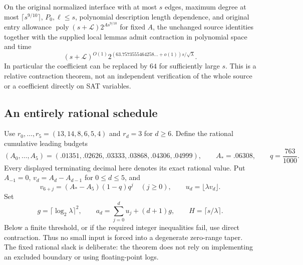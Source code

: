 \begin{theorem}
\label{thm:multistage-generic}
On the original normalized interface with at most $s$ edges, maximum degree
at most $\lceil s^{9/10}\rceil$, $P_0,\ell\le s$, polynomial description
length dependence, and original entry allowance
$\operatorname{poly}(s+\mathcal L)2^{A s^{9/10}}$ for fixed $A$, the unchanged
source identities together with the supplied local lemmas admit contraction
in polynomial space and time
\[
 (s+\mathcal L)^{O(1)}
 2^{(63.7573555464258\ldots+o(1))s/\sqrt\lambda}.
\]
In particular the coefficient can be replaced by $64$ for sufficiently
large $s$. This is a relative contraction theorem, not an independent
verification of the whole source or a coefficient directly on SAT variables.
\end{theorem}

\subsection{An entirely rational schedule}
Use $r_0,\ldots,r_5=(13,14,8,6,5,4)$ and $r_d=3$ for $d\ge6$.
Define the rational cumulative leading budgets
\[
 (A_0,\ldots,A_5)
 =(.01351,.02626,.03333,.03868,.04306,.04999),
 \qquad A_*=.06308,\qquad q=\frac{763}{1000}.
\]
Every displayed terminating decimal here denotes its exact rational value.
Put $A_{-1}=0$, $v_d=A_d-A_{d-1}$ for $0\le d\le5$, and
\[
 v_{6+j}=(A_*-A_5)(1-q)q^j\quad(j\ge0),\qquad
 u_d=\lfloor\lambda v_d\rfloor.
\]
Set
\[
 g=\lceil\log_2\lambda\rceil^2,\qquad
 a_d=\sum_{j=0}^d u_j+(d+1)g,\qquad H=\lceil s/\lambda\rceil.
\]
Below a finite threshold, or if the required integer inequalities fail,
use direct contraction. Thus no small input is forced into a degenerate
zero-range taper. The fixed rational slack is deliberate: the theorem does
not rely on implementing an excluded boundary or using floating-point logs.

